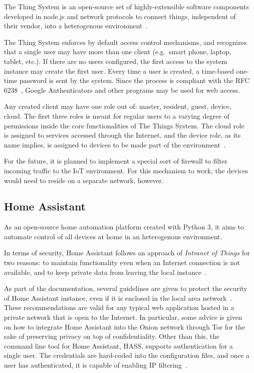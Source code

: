 \documentclass[12pt]{article}
\begin{document}
The Thing System is an open-source set of highly-extensible software components developed in node.js and network protocols to connect things, independent of their vendor, into a heterogenous environment~\cite{related_08}.

The Thing System enforces by default access control mechanisms, and recognizes that a single user may have more than one client (e.g.\ smart phone, laptop, tablet, etc.). If there are no users configured, the first access to the system instance may create the first user. Every time a user is created, a time-based one-time password is sent by the system. Since the process is compliant with the RFC 6238~\cite{RFC6238}, Google Authenticators and other programs may be used for web access.

Any created client may have one role out of: master, resident, guest, device, cloud. The first three roles is meant for regular users to a varying degree of permissions inside the core functionalities of The Things System. The cloud role is assigned to services accessed through the Internet, and the device role, as its name implies, is assigned to devices to be made part of the environment~\cite{related_08}. 

For the future, it is planned to implement a special sort of firewall to filter incoming traffic to the IoT environment. For this mechanism to work, the devices would need to reside on a separate network, however.

\subsection{Home Assistant}

As an open-source home automation platform created with Python 3, it aims to automate control of all devices at home in an heterogenous environment.

In terms of security, Home Assistant follows an approach of \emph{Intranet of Things} for two reasons: to maintain functionality even when an Internet connection is not available, and to keep private data from leaving the local instance~\cite{related_11}.

As part of the documentation, several guidelines are given to protect the security of Home Assistant instance, even if it is enclosed in the local area network~\cite{related_12}. These recommendations are valid for any typical web application hosted in a private network that is open to the Internet. In particular, some advice is given on how to integrate Home Assistant into the Onion network through Tor for the sake of preserving privacy on top of confidentiality. Other than this, the command line tool for Home Assistant, HASS, supports authentication for a single user. The credentials are hard-coded into the configuration files, and once a user has authenticated, it is capable of enabling IP filtering~\cite{related_10}.
\end{document}
